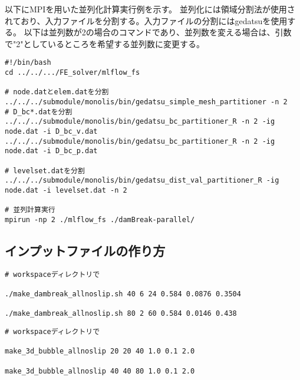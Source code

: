 以下にMPIを用いた並列化計算実行例を示す。
並列化には領域分割法が使用されており、入力ファイルを分割する。入力ファイルの分割にはgedatsuを使用する。
以下は並列数が2の場合のコマンドであり、並列数を変える場合は、引数で"2"としているところを希望する並列数に変更する。

\begin{lstlisting}[]
#!/bin/bash
cd ../../.../FE_solver/mlflow_fs

# node.datとelem.datを分割
../../../submodule/monolis/bin/gedatsu_simple_mesh_partitioner -n 2
# D_bc*.datを分割
../../../submodule/monolis/bin/gedatsu_bc_partitioner_R -n 2 -ig node.dat -i D_bc_v.dat
../../../submodule/monolis/bin/gedatsu_bc_partitioner_R -n 2 -ig node.dat -i D_bc_p.dat

# levelset.datを分割
../../../submodule/monolis/bin/gedatsu_dist_val_partitioner_R -ig node.dat -i levelset.dat -n 2

# 並列計算実行
mpirun -np 2 ./mlflow_fs ./damBreak-parallel/

\end{lstlisting}

\subsection{インプットファイルの作り方}

\begin{lstlisting}[]
# workspaceディレクトリで

./make_dambreak_allnoslip.sh 40 6 24 0.584 0.0876 0.3504

./make_dambreak_allnoslip.sh 80 2 60 0.584 0.0146 0.438

\end{lstlisting}

\begin{lstlisting}[]
# workspaceディレクトリで

make_3d_bubble_allnoslip 20 20 40 1.0 0.1 2.0

make_3d_bubble_allnoslip 40 40 80 1.0 0.1 2.0

\end{lstlisting}
